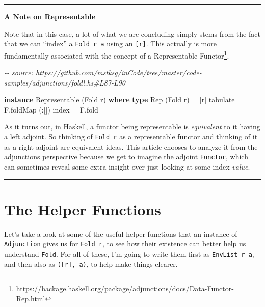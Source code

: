 \documentclass[]{article}
\newenvironment{Shaded}{}{}
\newcommand{\CommentTok}[1]{\textcolor[rgb]{0.38,0.63,0.69}{\textit{#1}}}
\newcommand{\DataTypeTok}[1]{\textcolor[rgb]{0.56,0.13,0.00}{#1}}
\newcommand{\FunctionTok}[1]{\textcolor[rgb]{0.02,0.16,0.49}{#1}}
\newcommand{\KeywordTok}[1]{\textcolor[rgb]{0.00,0.44,0.13}{\textbf{#1}}}
\newcommand{\NormalTok}[1]{#1}
\newcommand{\OperatorTok}[1]{\textcolor[rgb]{0.40,0.40,0.40}{#1}}
\newcommand{\OtherTok}[1]{\textcolor[rgb]{0.00,0.44,0.13}{#1}}
\renewcommand{\href}[2]{#2\footnote{\url{#1}}}
\begin{document}
\begin{center}\rule{0.5\linewidth}{0.5pt}\end{center}

\textbf{A Note on Representable}

Note that in this case, a lot of what we are concluding simply stems from the
fact that we can ``index'' a \texttt{Fold\ r\ a} using an \texttt{{[}r{]}}. This
actually is more fundamentally associated with the concept of a
\href{https://hackage.haskell.org/package/adjunctions/docs/Data-Functor-Rep.html}{Representable
Functor}.

\begin{Shaded}
\begin{Highlighting}[]
\CommentTok{{-}{-} source: https://github.com/mstksg/inCode/tree/master/code{-}samples/adjunctions/foldl.hs\#L87{-}L90}

\KeywordTok{instance} \DataTypeTok{Representable}\NormalTok{ (}\DataTypeTok{Fold}\NormalTok{ r) }\KeywordTok{where}
    \KeywordTok{type} \DataTypeTok{Rep}\NormalTok{ (}\DataTypeTok{Fold}\NormalTok{ r) }\OtherTok{=}\NormalTok{ [r]}
\NormalTok{    tabulate }\OtherTok{=}\NormalTok{ F.foldMap (}\OperatorTok{:}\NormalTok{[])}
    \FunctionTok{index}    \OtherTok{=}\NormalTok{ F.fold}
\end{Highlighting}
\end{Shaded}

As it turns out, in Haskell, a functor being representable is \emph{equivalent}
to it having a left adjoint. So thinking of \texttt{Fold\ r} as a representable
functor and thinking of it as a right adjoint are equivalent ideas. This article
chooses to analyze it from the adjunctions perspective because we get to imagine
the adjoint \texttt{Functor}, which can sometimes reveal some extra insight over
just looking at some index \emph{value}.

\begin{center}\rule{0.5\linewidth}{0.5pt}\end{center}

\section{The Helper Functions}\label{the-helper-functions}

Let's take a look at some of the useful helper functions that an instance of
\texttt{Adjunction} gives us for \texttt{Fold\ r}, to see how their existence
can better help us understand \texttt{Fold}. For all of these, I'm going to
write them first as \texttt{EnvList\ r\ a}, and then also as
\texttt{({[}r{]},\ a)}, to help make things clearer.
\end{document}
